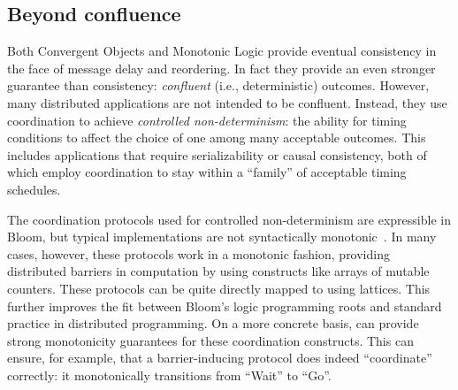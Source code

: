 \subsection{Beyond confluence}
Both Convergent Objects and Monotonic Logic provide eventual consistency in the face of message delay and reordering.  In fact they provide an even stronger guarantee than consistency: {\em confluent} (i.e., deterministic) outcomes.  However, many distributed applications are not intended to be confluent.  Instead, they use coordination to achieve {\em controlled non-determinism}: the ability for timing conditions to affect the choice of one among many acceptable outcomes. This includes applications that require serializability or causal consistency, both of which employ coordination to stay within a ``family'' of acceptable timing schedules.  

The coordination protocols used for controlled non-determinism are expressible in Bloom, but typical implementations are not syntactically monotonic~\cite{Alvaro2011}.  In many cases, however, these protocols work in a monotonic fashion, providing distributed barriers in computation by using constructs like arrays of mutable counters.  These protocols can be quite directly mapped to \lang using lattices.  This further improves the fit between Bloom's logic programming roots and standard practice in distributed programming.  On a more concrete basis, \lang can provide strong monotonicity guarantees for these coordination constructs.  This can ensure, for example, that a barrier-inducing protocol does indeed ``coordinate'' correctly: it monotonically transitions from ``Wait'' to ``Go''.

